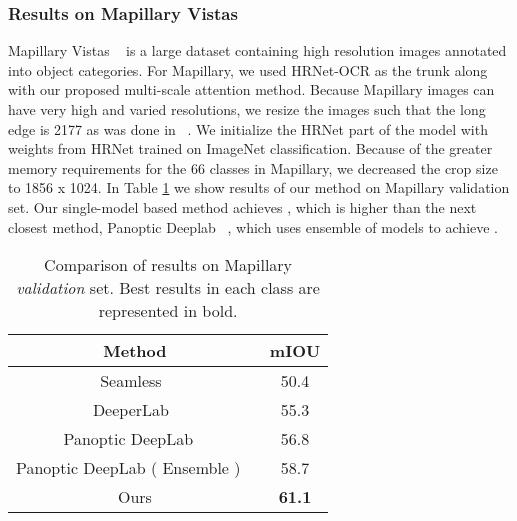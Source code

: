 \documentclass{article}
\begin{document}
\subsubsection{Results on Mapillary Vistas}
Mapillary Vistas ~\cite{MVD2017} is a large dataset containing  high resolution images annotated into  object categories. For Mapillary, we used HRNet-OCR as the trunk along with our proposed multi-scale attention method. Because Mapillary images can have very high and varied resolutions, we resize the images such that the long edge is 2177 as was done in ~\cite{cheng2019panopticdeeplab}. We initialize the HRNet part of the model with weights from HRNet trained on ImageNet classification. Because of the greater memory requirements for the 66 classes in Mapillary, we decreased the crop size to 1856 x 1024. In Table \ref{tab:table5} we show results of our method on Mapillary validation set. Our single-model based method achieves , which is  higher than the next closest method, Panoptic Deeplab ~\cite{cheng2019panopticdeeplab}, which uses ensemble of models to achieve . 

\begin{table}[htb!]
\centering
\begin{tabular}{|c       |c|} \hline
               Method  & mIOU \\ \hline\hline
Seamless~\cite{Porzi_2019_CVPR} & 50.4 \\ \hline               
DeeperLab~\cite{yang2019deeperlab} & 55.3 \\ \hline              
Panoptic DeepLab ~\cite{cheng2019panopticdeeplab}             &  56.8   \\ \hline
Panoptic DeepLab ( Ensemble ) ~\cite{cheng2019panopticdeeplab} &  58.7   \\ \hline
Ours                          &  \textbf{61.1}   \\ \hline
\end{tabular}
\vspace{2ex}
\caption{Comparison of results on Mapillary \textit{validation} set. Best results in each class are represented in bold.}
\label{tab:table5}
\end{table}
\end{document}
